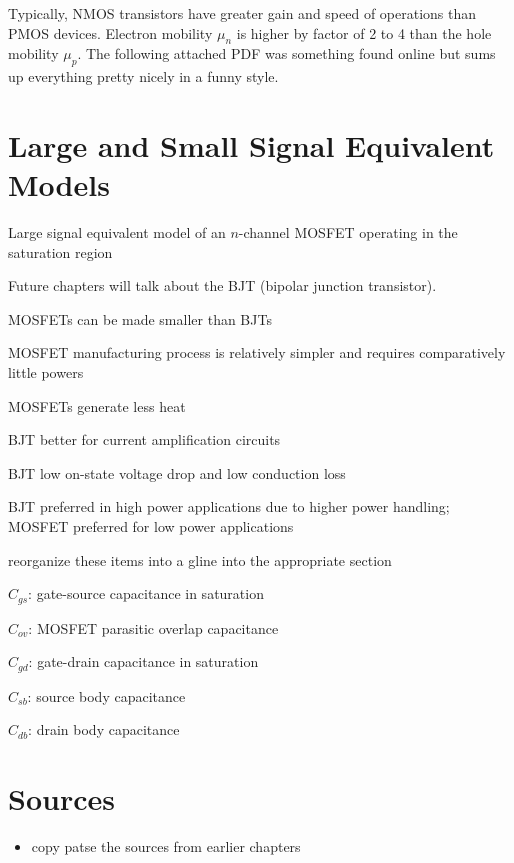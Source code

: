 Typically, NMOS transistors have greater gain and speed of operations than PMOS devices. Electron mobility $\mu_n$ is higher by factor of 2 to 4 than the hole mobility $\mu_p$. The following attached PDF was something found online but sums up everything pretty nicely in a funny style.

\newpage %
% 


\section{Large and Small Signal Equivalent Models}
Large signal equivalent model of an $n$-channel MOSFET operating in the saturation region


Future chapters will talk about the BJT (bipolar junction transistor). 
\begin{pline}
    \item MOSFETs can be made smaller than BJTs
    \item MOSFET manufacturing process is relatively simpler and requires comparatively little powers
    \item MOSFETs generate less heat
    \item BJT better for current amplification circuits
    \item BJT low on-state voltage drop and low conduction loss
    \item BJT preferred in high power applications due to higher power handling; MOSFET preferred for low power applications
\end{pline}

\begin{todo}
    \item reorganize these items into a gline into the appropriate section
    \item $C_{gs}$: gate-source capacitance in saturation
    \item $C_{ov}$: MOSFET parasitic overlap capacitance
    \item $C_{gd}$: gate-drain capacitance in saturation
    \item $C_{sb}$: source body capacitance
    \item $C_{db}$: drain body capacitance
\end{todo}


\section{Sources}
\begin{itemize}
    \item copy patse the sources from earlier chapters
\end{itemize}